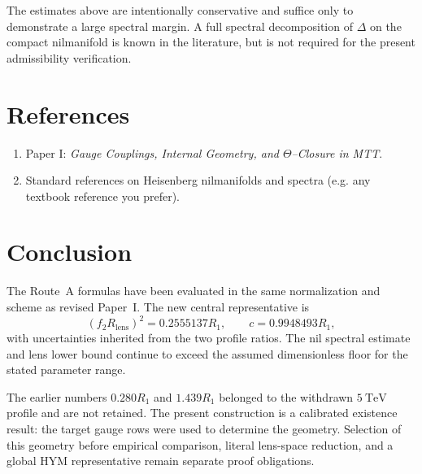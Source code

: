 \documentclass[11pt]{article}
\begin{document}
\begin{remark}
The estimates above are intentionally conservative and suffice only to demonstrate a large
spectral margin. A full spectral decomposition of $\Delta$ on the compact nilmanifold is known
in the literature, but is not required for the present admissibility verification.
\end{remark}
\section*{References}
\begin{enumerate}
\item Paper I: \emph{Gauge Couplings, Internal Geometry, and $\Theta$--Closure in MTT}.
\item Standard references on Heisenberg nilmanifolds and spectra (e.g. any textbook reference you prefer).
\end{enumerate}
\section{Conclusion}

The Route~A formulas have been evaluated in the same normalization and scheme
as revised Paper~I.  The new central representative is
\[
 (f_2R_{\mathrm{lens}})^2=0.2555137R_1,
 \qquad c=0.9948493R_1,
\]
with uncertainties inherited from the two profile ratios.  The nil spectral
estimate and lens lower bound continue to exceed the assumed dimensionless
floor for the stated parameter range.

The earlier numbers $0.280R_1$ and $1.439R_1$ belonged to the withdrawn
$5~\mathrm{TeV}$ profile and are not retained.  The present construction is a
calibrated existence result: the target gauge rows were used to determine the
geometry.  Selection of this geometry before empirical comparison, literal
lens-space reduction, and a global HYM representative remain separate proof
obligations.
\end{document}

